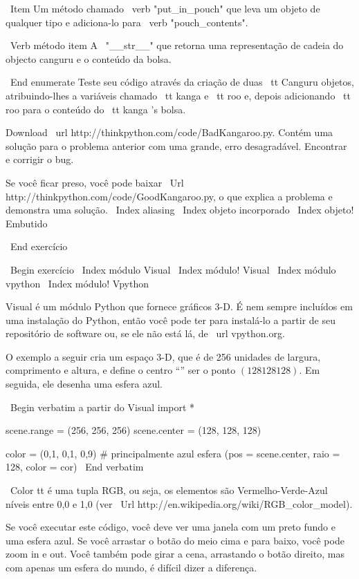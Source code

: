 \documentclass[10pt]{book}
\begin{document}
{{{{{{{{{{{{{{\ Item Um método chamado \ verb "put_in_pouch" que leva um objeto
de qualquer tipo e adiciona-lo para \ verb "pouch_contents".

\ Verb método item A \ "__str__" que retorna uma representação de cadeia
do objecto canguru e o conteúdo da bolsa.

\ End {enumerate}
%
Teste seu código 
através da criação de duas {\ tt Canguru} objetos, atribuindo-lhes a variáveis
chamado {\ tt kanga} e {\ tt roo} e, depois adicionando {\ tt roo} para o
conteúdo do {\ tt kanga} 's bolsa.

Download \ url {http://thinkpython.com/code/BadKangaroo.py}. Contém
uma solução para o problema anterior com uma grande, erro desagradável.
Encontrar e corrigir o bug.

Se você ficar preso, você pode baixar
\ Url {http://thinkpython.com/code/GoodKangaroo.py}, o que explica a
problema e demonstra uma solução.
\ Index {aliasing}
\ Index {objeto incorporado}
\ Index {objeto! Embutido}

\ End {} exercício




\ Begin {} exercício
\ Index {módulo Visual}
\ Index {módulo! Visual}
\ Index {módulo vpython}
\ Index {módulo! Vpython}

Visual é um módulo Python que fornece gráficos 3-D. É
nem sempre incluídos em uma instalação do Python, então você pode ter
para instalá-lo a partir de seu repositório de software ou, se ele não está lá,
de \ url {vpython.org}.

O exemplo a seguir cria um espaço 3-D, que é de 256 unidades
de largura, comprimento e altura, e define o centro ``'' ser o
ponto $ (128128128) $. Em seguida, ele desenha uma esfera azul.

\ Begin {verbatim}
a partir do Visual import *

scene.range = (256, 256, 256)
scene.center = (128, 128, 128)

color = (0,1, 0,1, 0,9) # principalmente azul
esfera (pos = scene.center, raio = 128, color = cor)
\ End {verbatim}

{\ Color tt} é uma tupla RGB, ou seja, os elementos são Vermelho-Verde-Azul
níveis entre 0,0 e 1,0 (ver
\ Url {http://en.wikipedia.org/wiki/RGB_color_model}).

Se você executar este código, você deve ver uma janela com um preto
fundo e uma esfera azul. Se você arrastar o botão do meio
cima e para baixo, você pode zoom in e out. Você também pode girar
a cena, arrastando o botão direito, mas com apenas um
esfera do mundo, é difícil dizer a diferença.

}}}}}}}}}}}}}}
\end{document}
